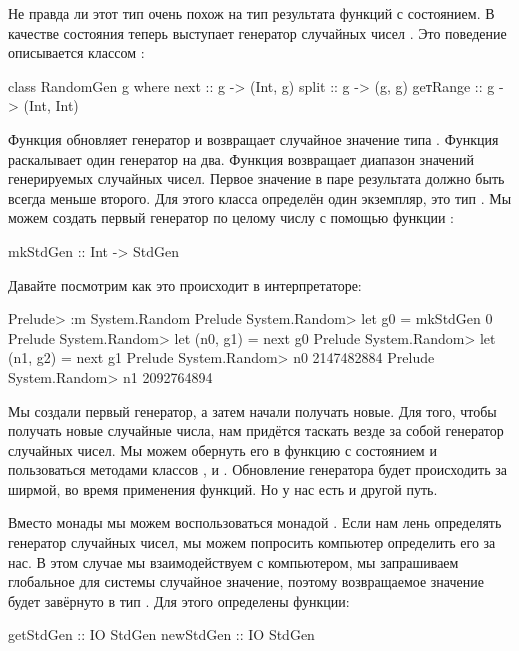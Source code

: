 Не правда ли этот тип очень похож на тип результата
функций с состоянием. В качестве состояния теперь выступает
генератор случайных чисел . Это поведение 
описывается классом :

\begin{code}
class RandomGen g where
    next     :: g -> (Int, g)
    split    :: g -> (g, g)
    geтRange :: g -> (Int, Int)
\end{code}

Функция  обновляет генератор и возвращает случайное
значение типа . Функция  раскалывает один
генератор на два. Функция  возвращает диапазон
значений генерируемых случайных чисел. Первое значение в паре
результата  должно быть всегда меньше второго. 
Для этого класса определён один экземпляр, это тип .
Мы можем создать первый генератор по целому числу с помощью
функции :

\begin{code}
mkStdGen :: Int -> StdGen
\end{code}

Давайте посмотрим как это происходит в интерпретаторе:

\begin{code}
Prelude> :m System.Random
Prelude System.Random> let g0 = mkStdGen 0
Prelude System.Random> let (n0, g1) = next g0
Prelude System.Random> let (n1, g2) = next g1
Prelude System.Random> n0
2147482884
Prelude System.Random> n1
2092764894
\end{code}

Мы создали первый генератор, а затем начали получать новые.
Для того, чтобы получать новые случайные числа, нам придётся
таскать везде за собой генератор случайных чисел. Мы можем
обернуть его в функцию с состоянием и пользоваться 
методами классов ,  и .
Обновление генератора будет происходить за ширмой, во
время применения функций. Но у нас есть и другой путь.

Вместо монады  мы можем воспользоваться 
монадой . Если нам лень определять генератор случайных чисел, 
мы можем попросить компьютер определить его за нас. В этом случае мы 
взаимодействуем с компьютером, мы запрашиваем 
глобальное для системы случайное значение, поэтому
возвращаемое значение будет завёрнуто в тип . 
Для этого определены функции:

\begin{code}
getStdGen :: IO StdGen
newStdGen :: IO StdGen
\end{code}

